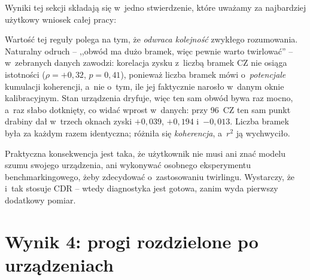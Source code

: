 \documentclass[11pt]{article}
\begin{document}
Wyniki tej sekcji składają się w~jedno stwierdzenie, które uważamy za najbardziej użytkowy wniosek
całej pracy:

\begin{center}
\end{center}

Wartość tej reguły polega na tym, że \emph{odwraca kolejność} zwykłego rozumowania. Naturalny
odruch -- ,,obwód ma dużo bramek, więc pewnie warto twirlować'' -- w~zebranych danych zawodzi:
korelacja zysku z~liczbą bramek CZ nie osiąga istotności ($\rho=+0{,}32$, $p=0{,}41$), ponieważ
liczba bramek mówi o~\emph{potencjale} kumulacji koherencji, a~nie o~tym, ile jej faktycznie narosło
w~danym oknie kalibracyjnym. Stan urządzenia dryfuje, więc ten sam obwód bywa raz mocno, a~raz słabo
dotknięty, co widać wprost w~danych: przy 96~CZ ten sam punkt drabiny dał w~trzech oknach zyski
$+0{,}039$, $+0{,}194$ i~$-0{,}013$. Liczba bramek była za każdym razem identyczna; różniła się
\emph{koherencja}, a~$r^2$ ją wychwyciło.

Praktyczna konsekwencja jest taka, że użytkownik nie musi ani znać modelu szumu swojego urządzenia,
ani wykonywać osobnego eksperymentu benchmarkingowego, żeby zdecydować o~zastosowaniu twirlingu.
Wystarczy, że i~tak stosuje CDR -- wtedy diagnostyka jest gotowa, zanim wyda pierwszy dodatkowy
pomiar.

\section{Wynik 4: progi rozdzielone po urządzeniach}\label{sec:progi}
\end{document}
